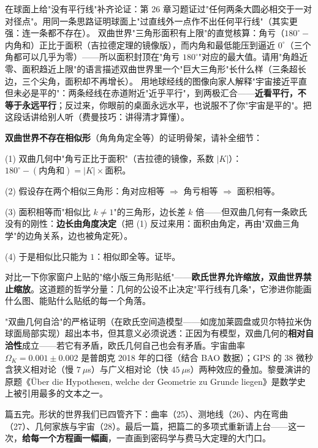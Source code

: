 \begin{dongshou}
\begin{itemize}
  \yisi 在球面上给"没有平行线"补齐论证：第 26 章习题证过"任何两条大圆必相交于一对对径点"。用同一条思路证明球面上"过直线外一点作不出任何平行线"（其实更强：连一条都不存在）。
  \yier 双曲世界"三角形面积有上限"的直觉核算：角亏（$180^\circ -$ 内角和）正比于面积（吉拉德定理的镜像版），而内角和最低能压到逼近 $0^\circ$（三个角都可以几乎为零）——所以面积封顶在"角亏 $180^\circ$"对应的最大值。请用"角趋近零、面积趋近上限"的语言描述双曲世界里一个"巨大三角形"长什么样（三条超长边，三个尖角，面积却不再增长）。
  \yier 用地球经线的图像向家人解释"宇宙接近平直但未必是平的"：两条经线在赤道附近"近乎平行"，到两极汇合——\textbf{近看平行，不等于永远平行}；反过来，你眼前的桌面永远水平，也说服不了你"宇宙是平的"。把这段话讲给别人听（费曼技巧：讲得清才算懂）。
\end{itemize}
\end{dongshou}

\begin{shaonao}
\textbf{双曲世界不存在相似形}（角角角定全等）的证明骨架，请补全细节：

(1) 双曲几何中"角亏正比于面积"（吉拉德的镜像，系数 $|K|$）：$180^\circ - (\text{内角和}) = |K|\times\text{面积}$。

(2) 假设存在两个相似三角形：角对应相等 $\Rightarrow$ 角亏相等 $\Rightarrow$ 面积相等。

(3) 面积相等而"相似比 $k \ne 1$"的三角形，边长差 $k$ 倍——但双曲几何有一条欧氏没有的刚性：\textbf{边长由角度决定}（把 (1) 反过来用：面积由角定，再由"双曲三角学"的边角关系，边也被角定死）。

(4) 于是相似比只能为 $1$：相似即全等。证毕。

对比一下你家窗户上贴的"缩小版三角形贴纸"——\textbf{欧氏世界允许缩放，双曲世界禁止缩放}。这道题的哲学分量：几何的公设不止决定"平行线有几条"，它渗进你能画什么图、能贴什么贴纸的每一个角落。
\end{shaonao}

\begin{chengshi}
"双曲几何自洽"的严格证明（在欧氏空间造模型——如庞加莱圆盘或贝尔特拉米伪球面局部实现）超出本书，但其意义必须说透：正因为有模型，双曲几何的\textbf{相对自洽性}成立——若它有矛盾，欧氏几何自己也会有矛盾。宇宙曲率 $\Omega_K = 0.001\pm0.002$ 是普朗克 2018 年的口径（结合 BAO 数据）；GPS 的 $38$ 微秒含狭义相对论（慢 $7\ \mu$s）与广义相对论（快 $45\ \mu$s）两种效应的叠加。黎曼演讲的原题《\"Uber die Hypothesen, welche der Geometrie zu Grunde liegen》是数学史上被引用最多的文本之一。
\end{chengshi}

篇五完。形状的世界我们已四管齐下：曲率（25）、测地线（26）、内在弯曲（27）、几何家族与宇宙（28）。最后一篇，把篇二的多项式重新请上台——这一次，\textbf{给每一个方程画一幅画}，一直画到密码学与费马大定理的大门口。
